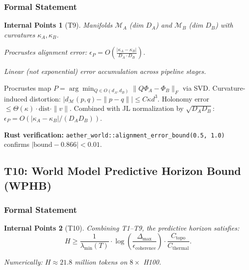 \documentclass[11pt, a4paper]{article}
\theoremstyle{proofform}
\newtheorem{innerpoints}{Internal Points}
\numberwithin{innerpoints}{subsection}
\numberwithin{disproof}{subsection}
\theoremstyle{mathproof}
\begin{document}
\subsubsection*{Formal Statement}
\begin{innerpoints}[T9]
\item Manifolds $\mathcal{M}_A$ (dim $D_A$) and $\mathcal{M}_B$ (dim $D_B$) with curvatures $\kappa_A, \kappa_B$.
\item Procrustes alignment error: $\epsilon_P = O\left(\frac{|\kappa_A - \kappa_B|}{D_A \cdot D_B}\right)$.
\item Linear (not exponential) error accumulation across pipeline stages.
\end{innerpoints}

\begin{Proof}
Procrustes map $P = \arg\min_{Q \in O(d_A, d_B)} \|Q\Phi_A - \Phi_B\|_F$ via SVD. Curvature-induced distortion: $|d_\mathcal{M}(p,q) - \|p-q\|| \leq C \kappa d^3$. Holonomy error $\leq \Theta(\kappa) \cdot \text{dist} \cdot \|v\|$. Combined with JL normalization by $\sqrt{D_A D_B}$: $\epsilon_P = O(|\kappa_A - \kappa_B| / (D_A D_B))$.

\textbf{Rust verification:} \texttt{aether\_world::alignment\_error\_bound(0.5, 1.0)} confirms $|\text{bound} - 0.866| < 0.01$.
\end{Proof}

\subsection{T10: World Model Predictive Horizon Bound (WPHB)}
\label{sec:wphb}

\subsubsection*{Formal Statement}
\begin{innerpoints}[T10]
\item Combining T1--T9, the predictive horizon satisfies:
\[
H \geq \frac{1}{\lambda_{\min}(T)} \cdot \log\!\left(\frac{\Delta_{\max}}{\epsilon_{\text{coherence}}}\right) \cdot \frac{C_{\text{topo}}}{C_{\text{thermal}}}.
\]
\item Numerically: $H \approx 21.8$ million tokens on $8\times$ H100.
\end{innerpoints}
\end{document}
